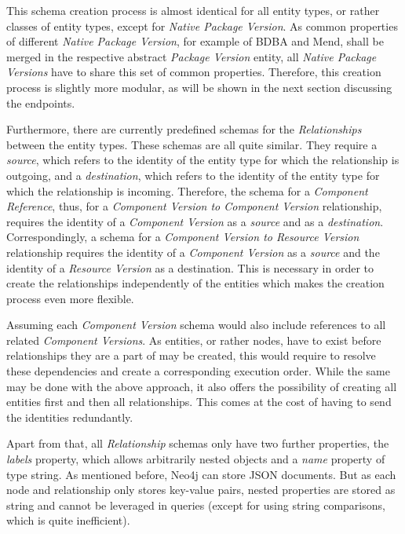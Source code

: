 This schema creation process is almost identical for all entity types, or rather classes of entity types, except for \emph{Native Package Version}. As common properties of different \emph{Native Package Version}, for example of BDBA and Mend, shall be merged in the respective abstract \emph{Package Version} entity, all \emph{Native Package Versions} have to share this set of common properties. Therefore, this creation process is slightly more modular, as will be shown in the next section discussing the endpoints.\par
Furthermore, there are currently predefined schemas for the \emph{Relationships} between the entity types. These schemas are all quite similar. They require a \emph{source}, which refers to the identity of the entity type for which the relationship is outgoing, and a \emph{destination}, which refers to the identity of the entity type for which the relationship is incoming. Therefore, the schema for a \emph{Component Reference}, thus, for a \emph{Component Version to Component Version} relationship, requires the identity of a \emph{Component Version} as a \emph{source} and as a \emph{destination}. Correspondingly, a schema for a \emph{Component Version to Resource Version} relationship requires the identity of a \emph{Component Version} as a \emph{source} and the identity of a \emph{Resource Version} as a destination. This is necessary in order to create the relationships independently of the entities which makes the creation process even more flexible.\par 
Assuming each \emph{Component Version} schema would also include references to all related \emph{Component Versions}. As entities, or rather nodes, have to exist before relationships they are a part of may be created, this would require to resolve these dependencies and create a corresponding execution order. While the same may be done with the above approach, it also offers the possibility of creating all entities first and then all relationships. This comes at the cost of having to send the identities redundantly.\par 
Apart from that, all \emph{Relationship} schemas only have two further properties, the \emph{labels} property, which allows arbitrarily nested objects and a \emph{name} property of type string. As mentioned before, Neo4j can store JSON documents. But as each node and relationship only stores key-value pairs, nested properties are stored as string and cannot be leveraged in queries (except for using string comparisons, which is quite inefficient).

